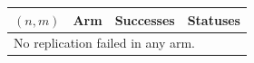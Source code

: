 \begin{tabular}{llrl}
\hline
$(n,m)$ & Arm & Successes & Statuses \\
\hline
\multicolumn{4}{l}{No replication failed in any arm.} \\
\hline
\end{tabular}
